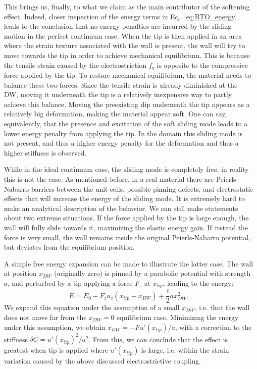 This brings us, finally, to what we claim as the main contributor of the softening effect.
Indeed, closer inspection of the energy terms in Eq.~\eqref{eq:BTO_energy} leads to the conclusion that no energy penalties are incurred by the sliding motion in the perfect continuum case.
When the tip is then applied in an area where the strain texture associated with the wall is present, the wall will try to move towards the tip in order to achieve mechanical equilibrium.
This is because the tensile strain caused by the electrostriction $f_q$ is opposite to the compressive force applied by the tip.
To restore mechanical equilibrium, the material needs to balance these two forces.
Since the tensile strain is already diminished at the DW, moving it underneath the tip is a relatively inexpensive way to partly achieve this balance.
Moving the preexisting dip underneath the tip appears as a relatively big deformation, making the material appear soft.
One can say, equivalently, that the presence and excitation of the soft sliding mode leads to a lower energy penalty from applying the tip.
In the domain this sliding mode is not present, and thus a higher energy penalty for the deformation and thus a higher stiffness is observed.

While in the ideal continuum case, the sliding mode is completely free, in reality this is not the case.
As mentioned before, in a real material there are Peierls-Nabarro barriers between the unit cells, possible pinning defects, and electrostatic effects that will increase the energy of the sliding mode.
It is extremely hard to make an analytical description of the behavior.
We can still make statements about two extreme situations.
If the force applied by the tip is large enough, the wall will fully slide towards it, maximizing the elastic energy gain.
If instead the force is very small, the wall remains inside the original Peierls-Nabarro potential, but deviates from the equilibrium position.

A simple free energy expansion can be made to illustrate the latter case.
The wall at position $x_{DW}$ (originally zero) is pinned by a parabolic potential with strength $a$, and perturbed by a tip applying a force $F_z$ at $x_{tip}$, leading to the energy:
\begin{equation}
	E = E_0 - F_z u_z (x_{tip} - x_{DW}) + \frac{1}{2}a x_{DW}^2.
\end{equation}
We expand this equation under the assumption of a small $x_{DW}$, i.e. that the wall does not move far from the $x_{DW}=0$ equilibrium case.
Minimizing the energy under this assumption, we obtain $x_{DW} = -F u'(x_{tip})/a$, with a correction to the stiffness $\delta C = u'(x_{tip})^2/a^2$.
From this, we can conclude that the effect is greatest when tip is applied where $u'(x_{tip})$ is large, i.e. within the strain variation caused by the above discussed electrostrictive coupling.

